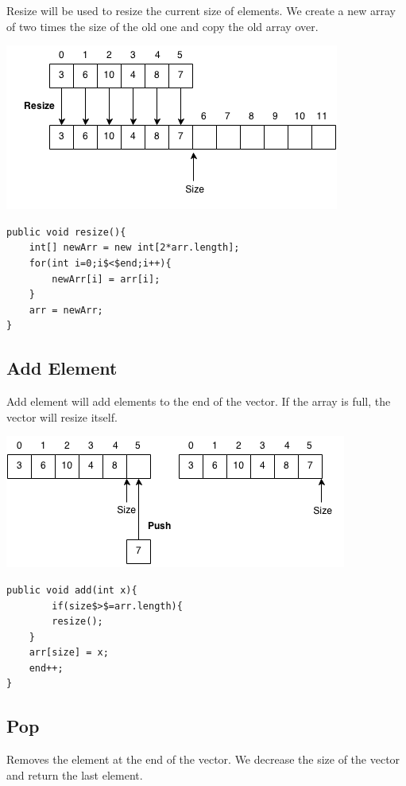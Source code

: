 \documentclass[11pt,oneside]{book}
\makeatletter
\def\maxwidth#1{\ifdim\Gin@nat@width>#1 #1\else\Gin@nat@width\fi}
\makeatother
\begin{document}
Resize will be used to resize the current size of elements. We create a new array of two times the size of the old one and copy the old array over.

\includegraphics[width=\maxwidth{\textwidth}]{vector3.png}

\begin{lstlisting}
public void resize(){
    int[] newArr = new int[2*arr.length];
    for(int i=0;i$<$end;i++){
        newArr[i] = arr[i];
    }
    arr = newArr;
}
\end{lstlisting}

\subsection{Add Element}

Add element will add elements to the end of the vector. If the array is full, the vector will resize itself.

\includegraphics[width=\maxwidth{\textwidth}]{vector2.png}

\begin{lstlisting}
public void add(int x){
        if(size$>$=arr.length){
        resize();
    }
    arr[size] = x;
    end++;
}
\end{lstlisting}

\subsection{Pop}

Removes the element at the end of the vector. We decrease the size of the vector and return the last element.
\end{document}
